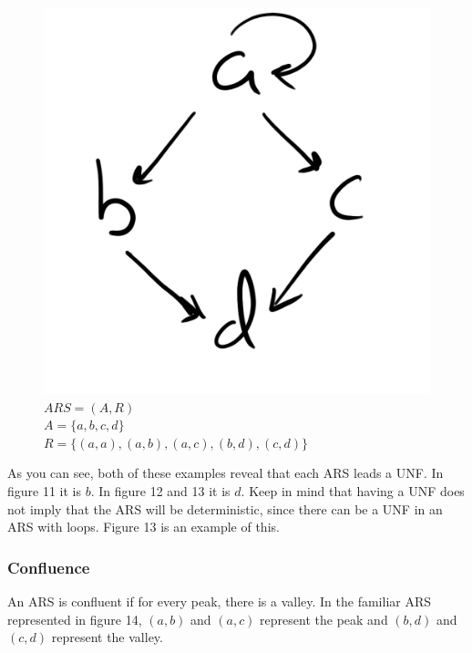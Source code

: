 \documentclass{article}
\begin{document}
\begin{figure}[H]
  \centering
  \includegraphics[scale=0.06]{gen13}
  \caption[] {
    $ARS = (A, R)$
    \\ $A=\{a, b, c, d\}$
    \\ $R=\{(a, a), (a, b), (a, c), (b, d), (c, d)\}$
    \endtabular}
\end{figure}

\medskip\noindent
As you can see, both of these examples reveal that each ARS leads a UNF. In figure 11 it is $b$. In figure 12 and 13 it is $d$. Keep in mind that having a UNF does not imply that the ARS will be deterministic, since there can be a UNF in an ARS with loops. Figure 13 is an example of this.


\subsubsection{Confluence}

\medskip\noindent
An ARS is confluent if for every peak, there is a valley. In the familiar ARS represented in figure 14, $(a, b)$ and $(a, c)$ represent the peak and $(b, d)$ and $(c, d)$ represent the valley.
\end{document}
